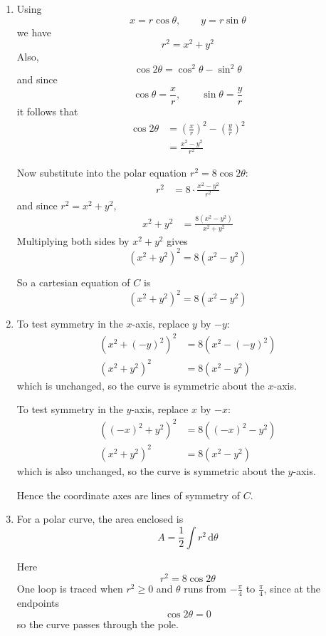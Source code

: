 \documentclass[leqno]{article}
\begin{document}
\begin{enumerate}[
	  label=\textbf{\arabic*.},
	  leftmargin=*,
	  topsep=0pt,
	  partopsep=0pt,
	  parsep=0pt
	]
	\begin{tcolorbox}[colback=white, colframe=scarlet, title={\textbf{Solution}}, breakable, grow to left by=6mm, grow to right by=10mm]
	\begin{enumerate}[label=\textbf{(\alph*)}]
	\item Using
	\[
	x=r\cos\theta,\qquad y=r\sin\theta
	\]
	we have
	\[
	r^2=x^2+y^2
	\]
	Also,
	\[
	\cos 2\theta=\cos^2\theta-\sin^2\theta
	\]
	and since
	\[
	\cos\theta=\frac{x}{r},\qquad \sin\theta=\frac{y}{r}
	\]
	it follows that
	\begin{align*}
	\cos 2\theta
	&=\left(\frac{x}{r}\right)^2-\left(\frac{y}{r}\right)^2 \\
	&=\frac{x^2-y^2}{r^2}
	\end{align*}
	
	Now substitute into the polar equation \(r^2=8\cos 2\theta\):
	\begin{align*}
	r^2&=8\cdot \frac{x^2-y^2}{r^2}
	\end{align*}
	and since \(r^2=x^2+y^2\),
	\begin{align*}
	x^2+y^2&=\frac{8(x^2-y^2)}{x^2+y^2}
	\end{align*}
	Multiplying both sides by \(x^2+y^2\) gives
	\[
	(x^2+y^2)^2=8(x^2-y^2)
	\]
	
	So a cartesian equation of \(C\) is
	\[
	(x^2+y^2)^2=8(x^2-y^2)
	\]
	
	\item To test symmetry in the \(x\)-axis, replace \(y\) by \(-y\):
	\begin{align*}
	(x^2+(-y)^2)^2&=8(x^2-(-y)^2) \\
	(x^2+y^2)^2&=8(x^2-y^2)
	\end{align*}
	which is unchanged, so the curve is symmetric about the \(x\)-axis.
	
	To test symmetry in the \(y\)-axis, replace \(x\) by \(-x\):
	\begin{align*}
	(( -x)^2+y^2)^2&=8(( -x)^2-y^2) \\
	(x^2+y^2)^2&=8(x^2-y^2)
	\end{align*}
	which is also unchanged, so the curve is symmetric about the \(y\)-axis.
	
	Hence the coordinate axes are lines of symmetry of \(C\).
	
	\item For a polar curve, the area enclosed is
	\[
	A=\frac12\int r^2\,\mathrm{d}\theta
	\]
	
	Here
	\[
	r^2=8\cos 2\theta
	\]
	One loop is traced when \(r^2\ge 0\) and \(\theta\) runs from \(-\frac{\pi}{4}\) to \(\frac{\pi}{4}\), since at the endpoints
	\[
	\cos 2\theta=0
	\]
	so the curve passes through the pole.
	

\end{enumerate}
\end{tcolorbox}
\end{enumerate}
\end{document}
